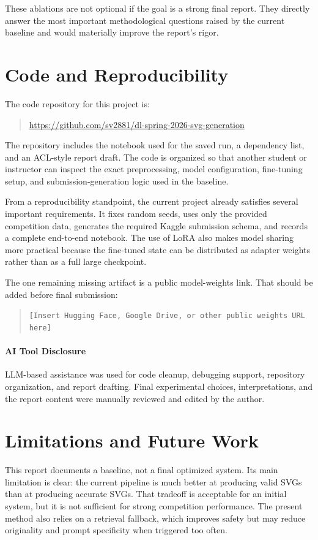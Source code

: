 \documentclass[11pt]{article}
\begin{document}
These ablations are not optional if the goal is a strong final report. They directly answer the most important methodological questions raised by the current baseline and would materially improve the report's rigor.

\section{Code and Reproducibility}
The code repository for this project is:
\begin{quote}
\small
\url{https://github.com/sv2881/dl-spring-2026-svg-generation}
\end{quote}

The repository includes the notebook used for the saved run, a dependency list, and an ACL-style report draft. The code is organized so that another student or instructor can inspect the exact preprocessing, model configuration, fine-tuning setup, and submission-generation logic used in the baseline.

From a reproducibility standpoint, the current project already satisfies several important requirements. It fixes random seeds, uses only the provided competition data, generates the required Kaggle submission schema, and records a complete end-to-end notebook. The use of LoRA also makes model sharing more practical because the fine-tuned state can be distributed as adapter weights rather than as a full large checkpoint.

The one remaining missing artifact is a public model-weights link. That should be added before final submission:
\begin{quote}
\small
\texttt{[Insert Hugging Face, Google Drive, or other public weights URL here]}
\end{quote}

\paragraph{AI Tool Disclosure}
LLM-based assistance was used for code cleanup, debugging support, repository organization, and report drafting. Final experimental choices, interpretations, and the report content were manually reviewed and edited by the author.

\section{Limitations and Future Work}
This report documents a baseline, not a final optimized system. Its main limitation is clear: the current pipeline is much better at producing valid SVGs than at producing accurate SVGs. That tradeoff is acceptable for an initial system, but it is not sufficient for strong competition performance. The present method also relies on a retrieval fallback, which improves safety but may reduce originality and prompt specificity when triggered too often.
\end{document}
